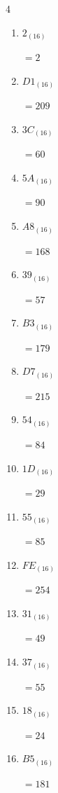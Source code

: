 \begin{multicols}{4}
\begin{enumerate}
        $=196$

  \item $2_{(16)}$

        $=2$

  \item $D1_{(16)}$

        $=209$

  \item $3C_{(16)}$

        $=60$

  \item $5A_{(16)}$

        $=90$

  \item $A8_{(16)}$

        $=168$

  \item $39_{(16)}$

        $=57$

  \item $B3_{(16)}$

        $=179$

  \item $D7_{(16)}$

        $=215$

  \item $54_{(16)}$

        $=84$

  \item $1D_{(16)}$

        $=29$

  \item $55_{(16)}$

        $=85$

  \item $FE_{(16)}$

        $=254$

\columnbreak %

  \item $31_{(16)}$

        $=49$

  \item $37_{(16)}$

        $=55$

  \item $18_{(16)}$

        $=24$

  \item $B5_{(16)}$

        $=181$


\end{enumerate}
\end{multicols}
